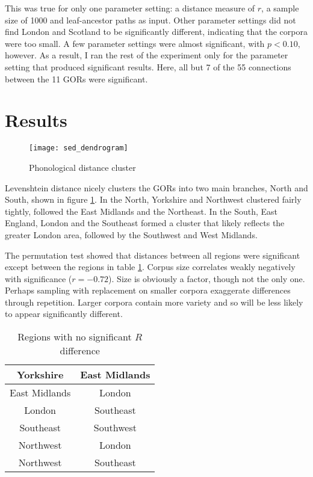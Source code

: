 \documentclass[11pt]{article}
\begin{document}
This was true for only one parameter setting: a distance measure of
$r$, a sample size of 1000 and leaf-ancestor paths as input. Other
parameter settings did not find London and Scotland to be
significantly different, indicating that the corpora were too small. A
few parameter settings were almost significant, with $p < 0.10$,
however.  As a result, I ran the rest of the experiment only for the
parameter setting that produced significant results. Here, all but 7
of the 55 connections between the 11 GORs were significant.

\section{Results}

\begin{figure}
  \texttt{[image: sed\_dendrogram]}
\caption{Phonological distance cluster}
\label{phonology-dendrogram}
\end{figure}

Levenshtein distance nicely clusters the GORs into two main branches,
North and South, shown in figure \ref{phonology-dendrogram}. In the
North, Yorkshire and Northwest clustered fairly tightly, followed the
East Midlands and the Northeast. In the South, East England, London
and the Southeast formed a cluster that likely reflects the greater
London area, followed by the Southwest and West Midlands.

The permutation test showed that distances between all regions were
significant except between the regions in table
\ref{syntax-nonsig}. Corpus size correlates weakly negatively with
significance ($r = -0.72$). Size is obviously a factor, though not the
only one. Perhaps sampling with replacement on smaller corpora
exaggerate differences through repetition. Larger corpora contain more
variety and so will be less likely to appear significantly different.

\begin{table}
\begin{tabular}{cc}
  Yorkshire & East Midlands \\ \hline
  East Midlands & London \\\hline
  London & Southeast \\\hline
  Southeast & Southwest \\\hline
  Northwest & London\\\hline
  Northwest & Southeast \\\hline
\end{tabular}
\caption{Regions with no significant $R$ difference}
\label{syntax-nonsig}
\end{table}
\end{document}
